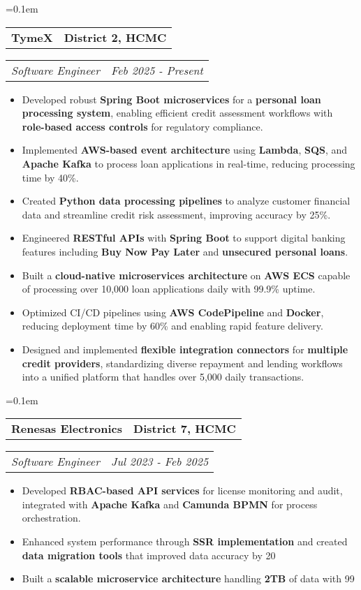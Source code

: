 \documentclass[11pt,letterpaper]{article}
\makeatletter
\newcommand{\headerrow}[2]
{\begin{tabular*}{\linewidth}{l@{\extracolsep{\fill}}r}
#1 &
#2 \\
\end{tabular*}}
\makeatother
\begin{document}
\parskip=0.1em
\headerrow
{\large\textbf{TymeX}}
{\textbf{District 2, HCMC}}
\headerrow
{\emph{Software Engineer}}
{\emph{Feb 2025 - Present}}
\begin{itemize}[leftmargin=1em,noitemsep]
    \item Developed robust \textbf{Spring Boot microservices} for a \textbf{personal loan processing system}, enabling efficient credit assessment workflows with \textbf{role-based access controls} for regulatory compliance.
    \item Implemented \textbf{AWS-based event architecture} using \textbf{Lambda}, \textbf{SQS}, and \textbf{Apache Kafka} to process loan applications in real-time, reducing processing time by 40\%.
    \item Created \textbf{Python data processing pipelines} to analyze customer financial data and streamline credit risk assessment, improving accuracy by 25\%.
    \item Engineered \textbf{RESTful APIs} with \textbf{Spring Boot} to support digital banking features including \textbf{Buy Now Pay Later} and \textbf{unsecured personal loans}.
    \item Built a \textbf{cloud-native microservices architecture} on \textbf{AWS ECS} capable of processing over 10,000 loan applications daily with 99.9\% uptime.
    \item Optimized CI/CD pipelines using \textbf{AWS CodePipeline} and \textbf{Docker}, reducing deployment time by 60\% and enabling rapid feature delivery.
    \item Designed and implemented \textbf{flexible integration connectors} for \textbf{multiple credit providers}, standardizing diverse repayment and lending workflows into a unified platform that handles over 5,000 daily transactions.
\end{itemize}
\parskip=0.1em
\headerrow
{\large\textbf{Renesas Electronics}}
{\textbf{District 7, HCMC}}
\headerrow
{\emph{Software Engineer}}
{\emph{Jul 2023 - Feb 2025}}
\begin{itemize}[leftmargin=1em,noitemsep]
    \item Developed \textbf{RBAC-based API services} for license monitoring and audit, integrated with \textbf{Apache Kafka} and \textbf{Camunda BPMN} for process orchestration.
    \item Enhanced system performance through \textbf{SSR implementation} and created \textbf{data migration tools} that improved data accuracy by 20%
    \item Built a \textbf{scalable microservice architecture} handling \textbf{2TB} of data with 99%
\end{itemize}
\end{document}
